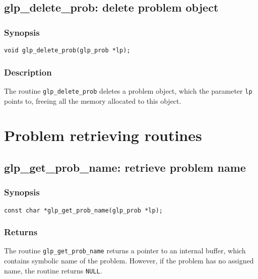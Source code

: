 \subsection{glp\_delete\_prob: delete problem object}

\subsubsection*{Synopsis}

\begin{verbatim}
void glp_delete_prob(glp_prob *lp);
\end{verbatim}

\subsubsection*{Description}

The routine \verb|glp_delete_prob| deletes a problem object, which the
parameter \verb|lp| points to, freeing all the memory allocated to this
object.


\newpage

\section{Problem retrieving routines}

\subsection{glp\_get\_prob\_name: retrieve problem name}

\subsubsection*{Synopsis}

\begin{verbatim}
const char *glp_get_prob_name(glp_prob *lp);
\end{verbatim}

\subsubsection*{Returns}

The routine \verb|glp_get_prob_name| returns a pointer to an internal
buffer, which contains symbolic name of the problem. However, if the
problem has no assigned name, the routine returns \verb|NULL|.

